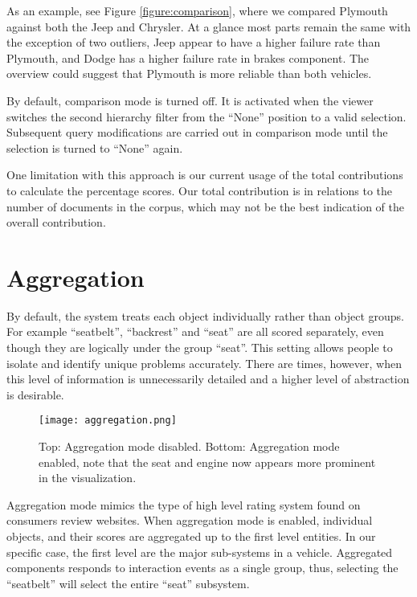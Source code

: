 As an example, see Figure \ref{figure:comparison}, where we compared Plymouth
against both the Jeep and Chrysler. At a glance most parts remain the same
with the exception of two outliers, Jeep appear to have a higher failure rate
than Plymouth, and Dodge has a higher failure rate in brakes component. The
overview could suggest that Plymouth is more reliable than both vehicles.
 
By default, comparison mode is turned off. It is activated when the viewer
switches the second hierarchy filter from the ``None'' position to a valid
selection. Subsequent query modifications are carried out in comparison mode
until the selection is turned to ``None'' again.

One limitation with this approach is our current usage of the total
contributions to calculate the percentage scores. Our total contribution is in
relations to the number of documents in the corpus, which may not be
the best indication of the overall contribution.

 
 
 
\section{Aggregation}
By default, the system treats each object individually rather than object
groups. For example ``seatbelt'', ``backrest'' and ``seat'' are all scored
separately, even though they are logically under the group ``seat''. This
setting allows people to isolate and identify unique problems accurately. There
are times, however, when this level of information is unnecessarily detailed and
a higher level of abstraction is desirable.

	\begin{figure}
	 \centering  
	 \texttt{[image: aggregation.png]}
	 \caption[Aggregation View]{Top: Aggregation mode disabled. Bottom: Aggregation
	 mode enabled, note that the seat and engine now appears more prominent in the visualization.}
	 \label{figure:aggregation}
	\end{figure}
	
Aggregation mode mimics the type of high level rating system found on consumers
review websites. When aggregation mode is enabled, individual objects, and their
scores are aggregated up to the first level entities. In our specific case, the 
first level are the major sub-systems in a vehicle. Aggregated components
responds to interaction events as a single group, thus, selecting the
``seatbelt'' will select the entire ``seat'' subsystem.

